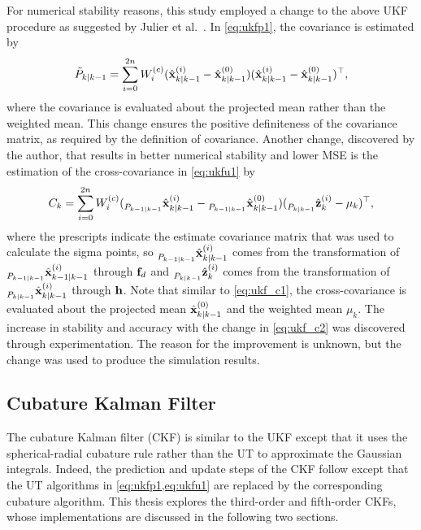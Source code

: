 \documentclass[../zhang_thesis.tex]{subfiles}
\begin{document}
For numerical stability reasons, this study employed a change to the above UKF procedure as suggested by Julier et al.~\cite{julier00}. In \cref{eq:ukfp1}, the covariance is estimated by
\begin{equation}
    \tilde{P}_{k|k-1} = \sum_{i=0}^{2n} W_i^{(c)} ( \hat{\mathbf{x}}_{k|k-1}^{(i)} - \hat{\mathbf{x}}_{k|k-1}^{(0)} ) ( \hat{\mathbf{x}}_{k|k-1}^{(i)} - \hat{\mathbf{x}}_{k|k-1}^{(0)} )^\top,
    \label{eq:ukf_c1}
\end{equation}
where the covariance is evaluated about the projected mean rather than the weighted mean. This change ensures the positive definiteness of the covariance matrix, as required by the definition of covariance. Another change, discovered by the author, that results in better numerical stability and lower MSE is the estimation of the cross-covariance in \cref{eq:ukfu1} by
\begin{equation}
    C_k = \sum_{i=0}^{2n} W_i^{(c)} ( \prescript{}{P_{k-1|k-1}}{\hat{\mathbf{x}}}_{k|k-1}^{(i)} - \prescript{}{P_{k-1|k-1}}{\hat{\mathbf{x}}}_{k|k-1}^{(0)} ) ( \prescript{}{P_{k|k-1}}{\hat{\mathbf{z}}}_k^{(i)} - \mu_k )^\top,
    \label{eq:ukf_c2}
\end{equation}
where the prescripts indicate the estimate covariance matrix that was used to calculate the sigma points, so $\prescript{}{P_{k-1|k-1}}{\hat{\mathbf{x}}}_{k|k-1}^{(i)}$ comes from the transformation of $\prescript{}{P_{k-1|k-1}}{\hat{\mathbf{x}}}_{k-1|k-1}^{(i)}$ through $\mathbf{f}_d$ and $\prescript{}{P_{k|k-1}}{\hat{\mathbf{z}}}_k^{(i)}$ comes from the transformation of $\prescript{}{P_{k|k-1}}{\hat{\mathbf{x}}}_{k|k-1}^{(i)}$ through $\mathbf{h}$. Note that similar to \cref{eq:ukf_c1}, the cross-covariance is
evaluated about the projected mean $\hat{\mathbf{x}}_{k|k-1}^{(0)}$ and the weighted mean $\mu_k$. The increase in stability and accuracy with the change in \cref{eq:ukf_c2} was discovered through experimentation. The reason for the improvement is unknown, but the change was used to produce the simulation results.

\subsection{Cubature Kalman Filter}

The cubature Kalman filter (CKF) is similar to the UKF except that it uses the spherical-radial cubature rule rather than the UT to approximate the Gaussian integrals. Indeed, the prediction and update steps of the CKF follow  except that the UT algorithms in \cref{eq:ukfp1,eq:ukfu1} are replaced by the corresponding cubature algorithm. This thesis explores the third-order and fifth-order CKFs, whose implementations are discussed in the following two sections.
\end{document}
